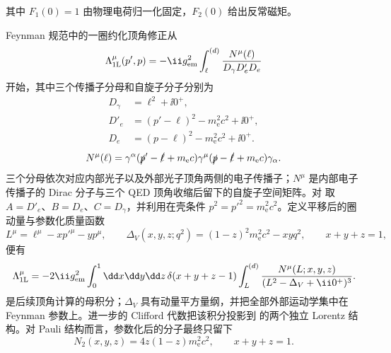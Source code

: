 其中 \(F_1(0)=1\) 由物理电荷归一化固定，\(F_2(0)\) 给出反常磁矩。

Feynman 规范中的一圈约化顶角修正从
\begin{equation}
 \Lambda_{\rm 1L}^\mu(p',p)
 =-\ii g_{\rm em}^2
 \int_{\ell}^{(d)}
 \frac{N^\mu(\ell)}{D_\gamma D'_eD_e}
 \label{eq:vertex-loop-start-r14}
\end{equation}
开始，其中三个传播子分母和自旋子分子分别为
\begin{equation}
{
\begin{aligned}
D_\gamma&=\ell^2+\ii0^+,\\
D'_e&=(p'-\ell)^2-m_{\mathrm e}^2c^2+\ii0^+,\\
D_e&=(p-\ell)^2-m_{\mathrm e}^2c^2+\ii0^+.
\end{aligned}}
\label{eq:vertex-propagator-denominators-dp75}
\end{equation}
\begin{equation}
{
N^\mu(\ell)=\gamma^\alpha
(\slashed p'-\slashed\ell+m_{\mathrm e} c)\gamma^\mu
(\slashed p-\slashed\ell+m_{\mathrm e} c)\gamma_\alpha.}
\label{eq:vertex-loop-numerator-dp75}
\end{equation}
三个分母依次对应内部光子以及外部光子顶角两侧的电子传播子；$N^\mu$ 是内部电子传播子的 Dirac 分子与三个 QED 顶角收缩后留下的自旋子空间矩阵。对 取
$A=D'_e$、$B=D_e$、$C=D_\gamma$，并利用在壳条件
$p^2=p'^2=m_{\mathrm e}^2c^2$。定义平移后的圈动量与参数化质量函数
\begin{equation}
{
L^\mu=\ell^\mu-xp'^\mu-yp^\mu,\qquad
\Delta_V(x,y,z;q^2)=(1-z)^2m_{\mathrm e}^2c^2-xyq^2,\qquad x+y+z=1,}
\label{eq:vertex-shift-delta-dp75}
\end{equation}
便有
\begin{equation}
{
\Lambda_{\rm 1L}^\mu
=-2\ii g_{\rm em}^2
\int_0^1\dd x\dd y\dd z\,
\delta(x+y+z-1)
\int_L^{(d)}
\frac{N^\mu(L;x,y,z)}{(L^2-\Delta_V+\ii0^+)^3}.}
\label{eq:vertex-parameterized-mother-dp75}
\end{equation}
 是后续顶角计算的母积分；$\Delta_V$ 具有动量平方量纲，并把全部外部运动学集中在 Feynman 参数上。进一步的 Clifford 代数把该积分投影到 的两个独立 Lorentz 结构。对 Pauli 结构而言，参数化后的分子最终只留下
\begin{equation}
 {N_2(x,y,z)=4z(1-z)m_{\mathrm e}^2c^2,\qquad x+y+z=1.}
 \label{eq:vertex-pauli-numerator-r68}
\end{equation}


